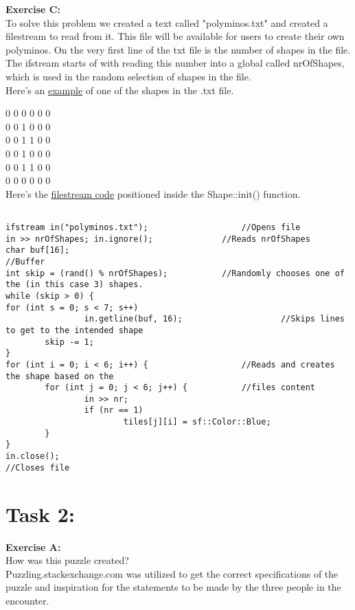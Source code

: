 \documentclass[11pt]{amsart}
\begin{document}
\textbf{Exercise C:} \\

To solve this problem we created a text called "polyminos.txt" and created a filestream to read from it.
This file will be available for users to create their own polyminos. On the very first line of the txt file is the
number of shapes in the file. The ifstream starts of with reading this number into a global called nrOfShapes, which
is used in the random selection of shapes in the file. \\

Here's an \underline{example} of one of the shapes in the .txt file.

0 0 0 0 0 0 \\
0 0 1 0 0 0 \\
0 0 1 1 0 0 \\
0 0 1 0 0 0 \\
0 0 1 1 0 0 \\
0 0 0 0 0 0 \\

Here's the \underline{filestream code} positioned inside the Shape::init() function.

\begin {verbatim}

ifstream in("polyminos.txt");					//Opens file
in >> nrOfShapes; in.ignore();				//Reads nrOfShapes
char buf[16];													//Buffer
int skip = (rand() %
while (skip > 0) {
for (int s = 0; s < 7; s++)
				in.getline(buf, 16);					//Skips lines to get to the intended shape
		skip -= 1;
}
for (int i = 0; i < 6; i++) {					//Reads and creates the shape based on the
		for (int j = 0; j < 6; j++) {			//files content
				in >> nr;
				if (nr == 1)
						tiles[j][i] = sf::Color::Blue;
		}
}
in.close();														//Closes file

\end{verbatim}

\section{Task 2:}

\textbf{Exercise A:}\\

How was this puzzle created? \\
	Puzzling.stackexchange.com was utilized to get the correct specifications of the puzzle
	and inspiration for the statements to be made by the three people in the encounter. \\
\end{document}
